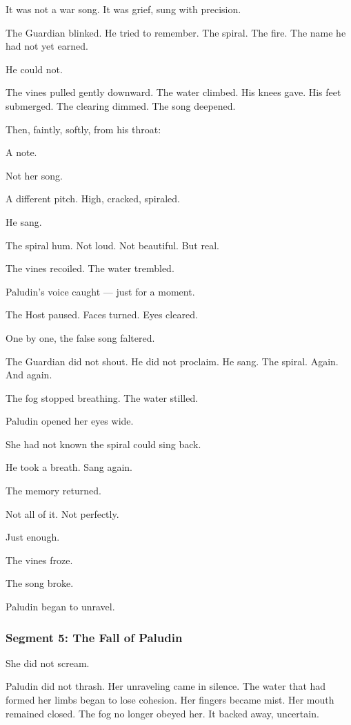 \documentclass[9pt]{article}
\begin{document}
It was not a war song. It was grief, sung with precision.

The Guardian blinked. He tried to remember. The spiral. The fire. The name he had not yet earned.

He could not.

The vines pulled gently downward. The water climbed. His knees gave. His feet submerged. The clearing dimmed. The song deepened.

Then, faintly, softly, from his throat:

A note.

Not her song.

A different pitch. High, cracked, spiraled.

He sang.

The spiral hum. Not loud. Not beautiful. But real.

The vines recoiled. The water trembled.

Paludin’s voice caught — just for a moment.

The Host paused. Faces turned. Eyes cleared.

One by one, the false song faltered.

The Guardian did not shout. He did not proclaim. He sang. The spiral. Again. And again.

The fog stopped breathing. The water stilled.

Paludin opened her eyes wide.

She had not known the spiral could sing back.

He took a breath. Sang again.

The memory returned.

Not all of it. Not perfectly.

Just enough.

The vines froze.

The song broke.

Paludin began to unravel.

\newpage

\subsubsection*{Segment 5: The Fall of Paludin}

She did not scream.

Paludin did not thrash. Her unraveling came in silence. The water that had formed her limbs began to lose cohesion. Her fingers became mist. Her mouth remained closed. The fog no longer obeyed her. It backed away, uncertain.
\end{document}
